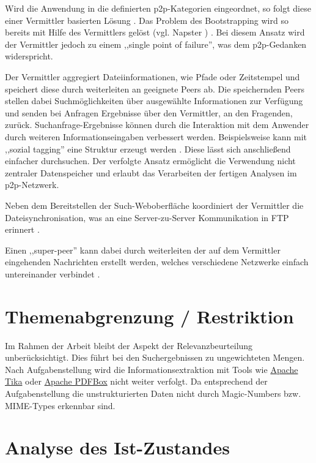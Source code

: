 \documentclass[oneside, ngerman, toc=bibliography,bibliography=totoc,listof=entryprefix, open=right,numbers=noenddot,fontsize=12pt]{scrbook}
\begin{document}
Wird die Anwendung in die definierten \acrshort{p2p}-Kategorien eingeordnet, so folgt diese einer Vermittler basierten Lösung \cite{backx2002comparison}. Das Problem des Bootstrapping wird so bereits mit Hilfe des Vermittlers gelöst (vgl. { Napster} \cite{mahlmann2007peer}) \cite{4144906}. Bei diesem Ansatz wird der Vermittler jedoch zu einem ,,single point of failure'', was dem \acrshort{p2p}-Gedanken widerspricht. 

Der Vermittler aggregiert Dateiinformationen, wie Pfade oder Zeitstempel und speichert diese durch weiterleiten an geeignete Peers ab. Die speichernden Peers stellen dabei Suchmöglichkeiten über ausgewählte Informationen zur Verfügung und senden bei Anfragen Ergebnisse über den Vermittler, an den Fragenden, zurück.
Suchanfrage-Ergebnisse können durch die Interaktion mit dem Anwender durch weiteren Informationseingaben verbessert werden.
Beispielsweise kann mit ,,sozial tagging'' eine Struktur erzeugt werden \cite{gaiser2008good}. Diese lässt sich anschließend einfacher durchsuchen. Der verfolgte Ansatz ermöglicht die Verwendung nicht zentraler Datenspeicher und erlaubt das Verarbeiten der fertigen Analysen im \acrshort{p2p}-Netzwerk.

Neben dem Bereitstellen der Such-Weboberfläche koordiniert der Vermittler die Dateisynchronisation, was an eine Server-zu-Server Kommunikation in FTP erinnert \cite{rfc959}.

Einen ,,super-peer'' kann dabei durch weiterleiten der auf dem Vermittler eingehenden Nachrichten erstellt werden, welches verschiedene Netzwerke einfach untereinander verbindet \cite{yang2003designing}.

\section{Themenabgrenzung / Restriktion}
Im Rahmen der Arbeit bleibt der Aspekt der Relevanzbeurteilung unberücksichtigt. Dies führt bei den Suchergebnissen zu ungewichteten Mengen. Nach Aufgabenstellung wird die Informationsextraktion mit Tools wie \href{http://tika.apache.org/}{Apache Tika} oder  \href{http://pdfbox.apache.org/}{Apache PDFBox} nicht weiter verfolgt. Da  entsprechend der Aufgabenstellung die unstrukturierten Daten nicht durch {Magic-Numbers bzw. MIME-Types} erkennbar sind.


\section{Analyse des Ist-Zustandes}\label{sec:ist}
\end{document}
